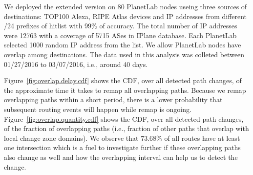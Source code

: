 We deployed the extended \dtrack{} version on 80 PlanetLab nodes useing three 
sources of destinations: TOP100 Alexa,  RIPE Atlas devices and IP addresses from 
different /24 prefixes of  hitlist with 99\% of accuracy. The total number of IP 
addresses were 12763 with a coverage of 5715 ASes in IPlane database. Each PlanetLab selected
1000 random IP address from the list. We allow PlanetLab nodes have overlap
among destinations. The data used in this analysis was colleted between 01/27/2016 
to 03/07/2016, i.e., around 40 days.

Figure~\ref{fig:overlap.delay.cdf} shows the CDF, over all detected
path changes, of the approximate time it takes to remap all
overlapping paths.  Because we remap overlapping paths within
a short period, there is a lower probability that subsequent routing
events will happen while remap is ongoing.
Figure~\ref{fig:overlap.quantity.cdf} shows the CDF, over all
detected path changes, of the fraction of overlapping paths (i.e.,
fraction of other paths that overlap with local change zone
domains).  We observe that 73.68\% of all routes have at least one 
intersection which is a fuel to investigate further if these
overlapping paths also change as well and how the overlapping
interval can help us to detect the change.


